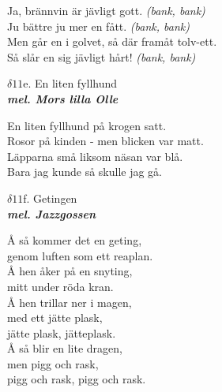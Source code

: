 \documentclass[a6paper,10pt]{article}
\newcommand{\mel}[1]{\small\textbf{\textit{mel. #1 \\}}}
\begin{document}
\newpage
\setlength{\oddsidemargin}{-0.37in}
\noindent
Ja, brännvin är jävligt gott. \textit{(bank, bank)}\\
Ju bättre ju mer en fått. \textit{(bank, bank)}\\
Men går en i golvet, så där framåt tolv-ett. \\
Så slår en sig jävligt hårt! \textit{(bank, bank)}
\vspace{20pt}
\begin{center}
\Large $\delta11$e. En liten fyllhund\\
\mel{Mors lilla Olle}
\end{center}
En liten fyllhund på krogen satt. \\
Rosor på kinden - men blicken var matt. \\
Läpparna små liksom näsan var blå. \\
Bara jag kunde så skulle jag gå. 
\vspace{20pt}
\begin{center}
\Large $\delta11$f. Getingen\\
\mel{Jazzgossen}
\end{center}
Å så kommer det en geting, \\
genom luften som ett reaplan. \\
Å hen åker på en snyting, \\
mitt under röda kran. \\
Å hen trillar ner i magen, \\
med ett jätte plask, \\
jätte plask, jätteplask. \\
Å så blir en lite dragen, \\
men pigg och rask, \\
pigg och rask, pigg och rask. 
\end{document}
